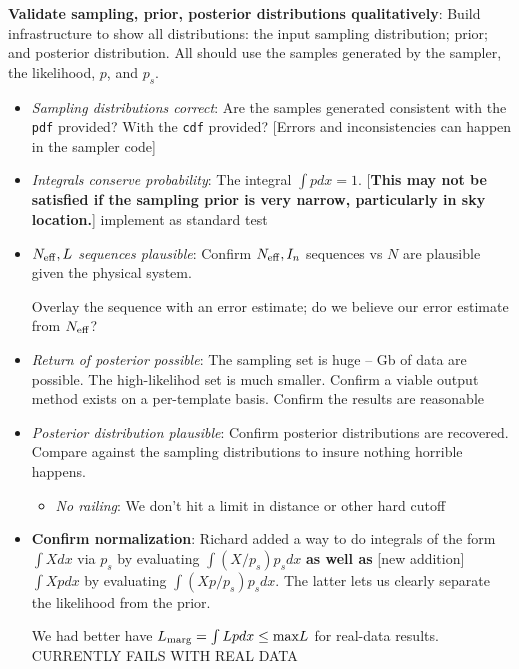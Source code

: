 \documentclass[twocolumn,prd,nofootinbib]{revtex4}
\newcommand\editremark[1]{{\color{red} #1}}
\begin{document}
\begin{widetext}
\begin{widetext}
\noindent \textbf{Validate sampling, prior, posterior distributions qualitatively}: Build infrastructure to show all distributions:
the input sampling distribution; prior; and posterior distribution.  All should use the samples generated by the
sampler, the likelihood, $p$, and $p_s$.
\begin{itemize}
\item \emph{Sampling distributions correct}: Are the samples generated consistent with the \texttt{pdf} provided? With
  the \texttt{cdf} provided?  [Errors and inconsistencies can happen in the sampler code]

\item \emph{Integrals conserve probability}: The integral $\int p dx=1$.  [\textbf{This may not be satisfied if the
    sampling prior is very narrow, particularly in sky location.}] \editremark{implement as standard test}


\item \emph{$N_{\rm eff},L$ sequences plausible}: Confirm $N_{\rm eff},I_n$ sequences vs $N$ are plausible given the
  physical system.

Overlay the sequence with an error estimate; do we believe our error estimate from $N_{\rm eff}$?

\item \emph{Return of posterior possible}: The sampling set is huge -- Gb of data are possible.   The high-likelihod set
  is much smaller.   Confirm a viable output method exists on a per-template basis.  Confirm the results are reasonable

\item \emph{Posterior distribution plausible}: Confirm posterior distributions are recovered.  Compare against the
  sampling distributions to insure nothing horrible happens. 
\begin{itemize}
\item \emph{No railing}: We don't hit a limit in distance or other hard cutoff
\end{itemize}

\item \textbf{Confirm normalization}: Richard added  a way to do integrals of the form $\int X dx$ via $p_s$ by
  evaluating $\int (X/p_s)  p_s dx$ \textbf{as well as} [new addition] $\int X p dx$ by evaluating $\int (X p/p_s)p_s
  dx$.  The latter lets us clearly separate the likelihood from the prior.

We had better have $L_{\rm marg} = \int L p dx \le \text{max} L$ for real-data results. \editremark{CURRENTLY FAILS WITH
REAL DATA}



\end{itemize}
\end{widetext}
\end{widetext}
\end{document}

